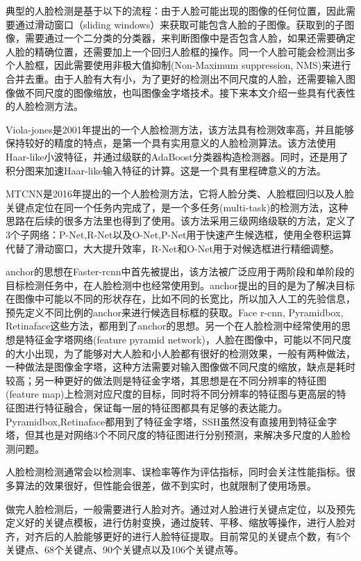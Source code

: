 典型的人脸检测是基于以下的流程：由于人脸可能出现的图像的任何位置，因此需要通过滑动窗口（sliding windows）来获取可能包含人脸的子图像。获取到的子图像，需要通过一个二分类的分类器，来判断图像中是否包含人脸，如果还需要确定人脸的精确位置，还需要加上一个回归人脸框的操作。同一个人脸可能会检测出多个人脸框，因此需要使用非极大值抑制(Non-Maximum suppression, NMS)来进行合并去重。由于人脸有大有小，为了更好的检测出不同尺度的人脸，还需要输入图像做不同尺度的图像缩放，也叫图像金字塔技术。接下来本文介绍一些具有代表性的人脸检测方法。

Viola-jones\cite{viola2001rapid}是2001年提出的一个人脸检测方法，该方法具有检测效率高，并且能够保持较好的精度的特点，是第一个具有实用意义的人脸检测算法。该方法使用Haar-like小波特征，并通过级联的AdaBoost分类器构造检测器。同时，还是用了积分图来加速Haar-like输入特征的计算。这是一个具有里程碑意义的方法。

MTCNN\cite{zhang2016joint}是2016年提出的一个人脸检测方法，它将人脸分类、人脸框回归以及人脸关键点定位在同一个任务内完成了，是一个多任务(multi-task)的检测方法，这种思路在后续的很多方法里也得到了使用。该方法采用三级网络级联的方法，定义了3个子网络：P-Net,R-Net以及O-Net,P-Net用于快速产生候选框，使用全卷积运算代替了滑动窗口，大大提升效率，R-Net和O-Net用于对候选框进行精细调整。

anchor的思想在Faster-rcnn\cite{ren2015faster}中首先被提出，该方法被广泛应用于两阶段和单阶段的目标检测任务中，在人脸检测中也经常使用到。anchor提出的目的是为了解决目标在图像中可能以不同的形状存在，比如不同的长宽比，所以加入人工的先验信息，预先定义不同比例的anchor来进行候选目标框的获取。Face r-cnn\cite{wang2017face}, Pyramidbox\cite{tang2018pyramidbox}, Retinaface\cite{deng2019retinaface}这些方法，都用到了anchor的思想。另一个在人脸检测中经常使用的思想是特征金字塔网络(feature pyramid network)，人脸在图像中，可能以不同尺度的大小出现，为了能够对大人脸和小人脸都有很好的检测效果，一般有两种做法，一种做法是图像金字塔，这种方法需要对输入图像做不同尺度的缩放，缺点是耗时较高；另一种更好的做法则是特征金字塔，其思想是在不同分辨率的特征图(feature map)上检测对应尺度的目标，同时将不同分辨率的特征图与更高层的特征图进行特征融合，保证每一层的特征图都具有足够的表达能力。Pyramidbox,Retinaface都用到了特征金字塔，SSH\cite{najibi2017ssh}虽然没有直接用到特征金字塔，但其也是对网络3个不同尺度的特征图进行分别预测，来解决多尺度的人脸检测问题。

人脸检测检测通常会以检测率、误检率等作为评估指标，同时会关注性能指标。很多算法的效果很好，但性能会很差，做不到实时，也就限制了使用场景。

做完人脸检测后，一般需要进行人脸对齐。通过对人脸进行关键点定位，以及预先定义好的关键点模板，进行仿射变换，通过旋转、平移、缩放等操作，进行人脸对齐，对齐后的人脸能够更好的进行人脸特征提取。目前常见的关键点个数，有5个关键点、68个关键点、90个关键点以及106个关键点等。

